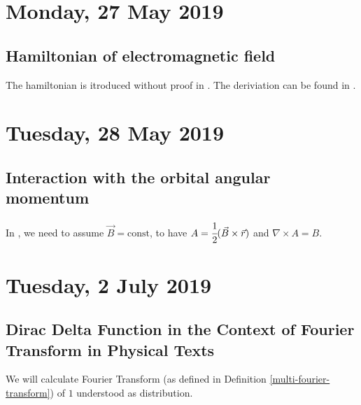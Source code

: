 \documentclass[main.tex]{subfiles}
\begin{document}
\section{Monday, 27 May 2019}
\subsection{Hamiltonian of electromagnetic field}
The hamiltonian is itroduced without proof in \cite[6.2]{desai2010}. The deriviation can be found in \cite[Examples 9.1 and 9.2]{walter-greiner2001}.
\section{Tuesday, 28 May 2019}
\subsection{Interaction with the orbital angular momentum}
In \cite[6.5]{desai2010}, we need to assume $\vec{B} = \text{const}$, to have $A = \cfrac{1}{2}(\vec{B}\times\vec{r})$ and $\nabla\times A = B$.
\section{Tuesday, 2 July 2019}
\subsection{Dirac Delta Function in the Context of Fourier Transform in Physical Texts}
We will calculate Fourier Transform (as defined in Definition \ref{multi-fourier-transform}) of $1$ understood as distribution.
\end{document}
